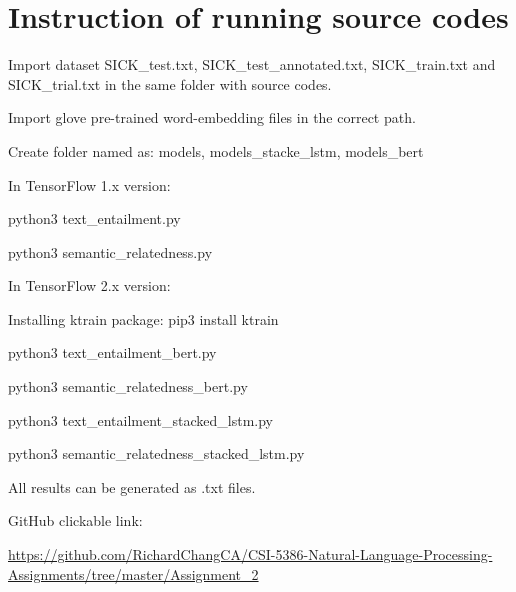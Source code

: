 \documentclass{article}
\begin{document}
\section{Instruction of running source codes}

Import dataset SICK\_test.txt, SICK\_test\_annotated.txt, SICK\_train.txt and SICK\_trial.txt in the same folder with source codes.

Import glove pre-trained word-embedding files in the correct path.

Create folder named as: models, models\_stacke\_lstm, models\_bert

In TensorFlow 1.x version:

python3 text\_entailment.py

python3 semantic\_relatedness.py

In TensorFlow 2.x version:

Installing ktrain package: pip3 install ktrain

python3 text\_entailment\_bert.py

python3 semantic\_relatedness\_bert.py

python3 text\_entailment\_stacked\_lstm.py

python3 semantic\_relatedness\_stacked\_lstm.py

All results can be generated as .txt files.

GitHub clickable link: 

\href{https://github.com/RichardChangCA/CSI-5386-Natural-Language-Processing-Assignments/tree/master/Assignment_2}{\url{https://github.com/RichardChangCA/CSI-5386-Natural-Language-Processing-Assignments/tree/master/Assignment_2}}




\end{document}
